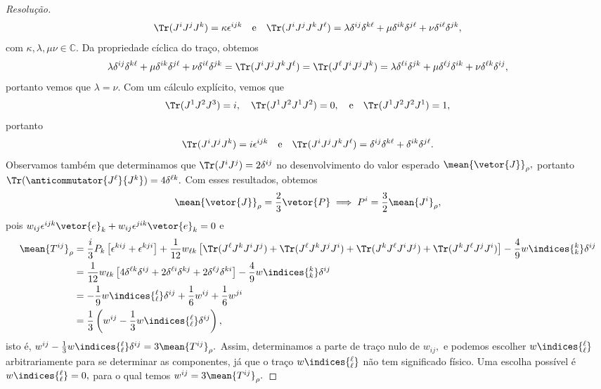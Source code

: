 \begin{proof}[Resolução]
\begin{equation*}
        \Tr(J^i J^j J^k) = \kappa \epsilon^{ijk}
        \quad\text{e}\quad
        \Tr(J^i J^j J^k J^\ell) = \lambda \delta^{ij} \delta^{k\ell} + \mu \delta^{i k} \delta^{j \ell} + \nu \delta^{i \ell} \delta^{jk},
    \end{equation*}
    com \(\kappa, \lambda, \mu \nu \in \mathbb{C}\). Da propriedade cíclica do traço, obtemos
    \begin{equation*}
        \lambda \delta^{i j} \delta^{k \ell} + \mu \delta^{i k} \delta^{j \ell} + \nu \delta^{i \ell} \delta^{j k} = \Tr(J^i J^j J^k J^\ell) = \Tr(J^\ell J^i J^j J^k) = 
        \lambda \delta^{\ell i} \delta^{j k} + \mu \delta^{\ell j} \delta^{i k} + \nu \delta^{\ell k} \delta^{i j},
    \end{equation*}
    portanto vemos que \(\lambda = \nu.\) Com um cálculo explícito, vemos que 
    \begin{equation*}
        \Tr(J^1 J^2 J^3) = i,\quad\Tr(J^1 J^2 J^1 J^2) = 0,\quad\text{e}\quad\Tr(J^1 J^2 J^2 J^1) = 1, 
    \end{equation*}
    portanto 
    \begin{equation*}
        \Tr(J^i J^j J^k) = i \epsilon^{ijk}
        \quad\text{e}\quad
        \Tr(J^i J^j J^k J^\ell) = \delta^{ij} \delta^{k \ell} + \delta^{ik} \delta^{j \ell}.
    \end{equation*}
    Observamos também que determinamos que \(\Tr(J^i J^j) = 2 \delta^{ij}\) no desenvolvimento do valor esperado \(\mean{\vetor{J}}_\rho,\) portanto \(\Tr(\anticommutator{J^\ell}{J^k}) = 4 \delta^{\ell k}.\) Com esses resultados, obtemos
    \begin{equation*}
        \mean{\vetor{J}}_{\rho} = \frac23 \vetor{P} \implies P^i = \frac32 \mean{J^i}_\rho,
    \end{equation*}
    pois \(w_{ij} \epsilon^{ijk} \vetor{e}_k + w_{ij} \epsilon^{jik} \vetor{e}_k = 0\) e
    \begin{align*}
        \mean{T^{ij}}_{\rho} &= \frac{i}{3} P_k \left[\epsilon^{kij} + \epsilon^{kji}\right] + \frac1{12} w_{\ell k} \left[\Tr(J^\ell J^k J^i J^j) + \Tr(J^\ell J^k J^j J^i) + \Tr(J^k J^\ell J^i J^j) + \Tr(J^k J^\ell J^j J^i)\right] - \frac49 w\indices{^k_k} \delta^{ij} \\
                             &= \frac{1}{12} w_{\ell k} \left[4\delta^{\ell k} \delta^{ij} + 2\delta^{\ell i} \delta^{kj} + 2\delta^{\ell j} \delta^{ki}\right] - \frac49 w\indices{^k_k} \delta^{ij}\\
                             &= -\frac19w\indices{^\ell_\ell}\delta^{ij} + \frac16 w^{ij} + \frac16 w^{ji}\\
                             &= \frac13 \left(w^{ij} - \frac13w\indices{^\ell_\ell} \delta^{ij}\right),
    \end{align*}
    isto é, \(w^{ij} - \frac13 w\indices{^\ell_\ell} \delta^{ij} = 3\mean{T^{ij}}_{\rho}.\) Assim, determinamos a parte de traço nulo de \(w_{ij},\) e podemos escolher \(w\indices{^\ell_\ell}\) arbitrariamente para se determinar as componentes, já que o traço \(w\indices{^\ell_\ell}\) não tem significado físico. Uma escolha possível é \(w\indices{^\ell_\ell} = 0,\) para o qual temos \(w^{ij} = 3\mean{T^{ij}}_\rho.\)
\end{proof}
